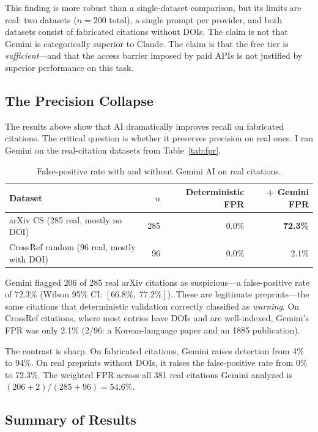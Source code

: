 This finding is more robust than a single-dataset comparison, but its limits are real: two datasets ($n=200$ total), a single prompt per provider, and both datasets consist of fabricated citations without DOIs. The claim is not that Gemini is categorically superior to Claude. The claim is that the free tier is \emph{sufficient}---and that the access barrier imposed by paid APIs is not justified by superior performance on this task.

\subsection{The Precision Collapse}

The results above show that AI dramatically improves recall on fabricated citations. The critical question is whether it preserves precision on real ones. I ran Gemini on the real-citation datasets from Table~\ref{tab:fpr}.

\begin{table}[H]
\centering
\caption{False-positive rate with and without Gemini AI on real citations.}
\label{tab:fpr-ai}
\begin{tabular}{@{}lrrr@{}}
\toprule
\textbf{Dataset} & \textbf{$n$} & \textbf{Deterministic FPR} & \textbf{+ Gemini FPR} \\
\midrule
arXiv CS (285 real, mostly no DOI)    & 285 & 0.0\% & \textbf{72.3\%} \\
CrossRef random (96 real, mostly with DOI) &  96 & 0.0\% & 2.1\% \\
\bottomrule
\end{tabular}
\end{table}

Gemini flagged 206 of 285 real arXiv citations as suspicious---a false-positive rate of 72.3\% (Wilson 95\% CI: $[66.8\%,\;77.2\%]$). These are legitimate preprints---the same citations that deterministic validation correctly classified as \textit{warning}. On CrossRef citations, where most entries have DOIs and are well-indexed, Gemini's FPR was only 2.1\% (2/96: a Korean-language paper and an 1885 publication).

The contrast is sharp. On fabricated citations, Gemini raises detection from 4\% to 94\%. On real preprints without DOIs, it raises the false-positive rate from 0\% to 72.3\%. The weighted FPR across all 381 real citations Gemini analyzed is $(206 + 2)/(285 + 96) = 54.6\%$.

\subsection{Summary of Results}

